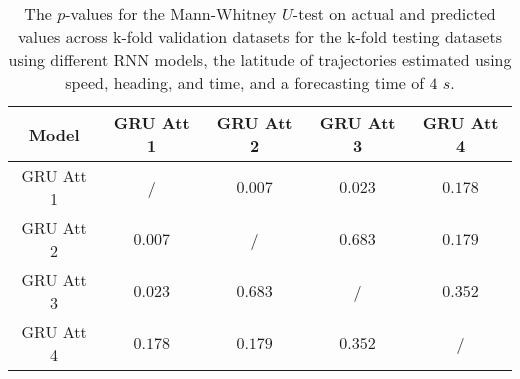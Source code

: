 \begin{table}[!ht]
	\centering
	\begin{tabular}{|c|c|c|c|c|}
		\hline
		Model & GRU Att 1 & GRU Att 2 & GRU Att 3 & GRU Att 4 \\ \hline
		GRU Att 1 & / & $\mathbf{0.007}$ & $\mathbf{0.023}$ & $\mathbf{0.178}$ \\ \hline
		GRU Att 2 & $\mathbf{0.007}$ & / & $\mathbf{0.683}$ & $\mathbf{0.179}$ \\ \hline
		GRU Att 3 & $\mathbf{0.023}$ & $\mathbf{0.683}$ & / & $\mathbf{0.352}$ \\ \hline
		GRU Att 4 & $\mathbf{0.178}$ & $\mathbf{0.179}$ & $\mathbf{0.352}$ & / \\ \hline
	\end{tabular}
	\caption{The $p$-values for the Mann-Whitney $U$-test on actual and predicted values across k-fold validation datasets for the k-fold testing datasets using different RNN models, the latitude of trajectories estimated using speed, heading, and time, and a forecasting time of $4$ $s$.}
	\label{tab:speed:actual:dir:p:lat:4}
\end{table}

